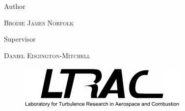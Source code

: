 \begin{titlepage}
	
	

	
	\vspace*{3\baselineskip} %
	
	
	Author
	
	\vspace{0.5\baselineskip} %
	
	{\scshape\large Brodie James Norfolk} %
	
	\vspace{2\baselineskip}
	Supervisor
	
	\vspace{0.5\baselineskip} %
	
	{\scshape\large Daniel Edgington-Mitchell} %
	
	\vspace{2\baselineskip} %
	
	
	\vfill %
	
	\begin{figure}[H] 
	 \centering
	 \includegraphics[scale=0.6]{ltrac_logo.png} 
    \end{figure}
	
	


\end{titlepage}
